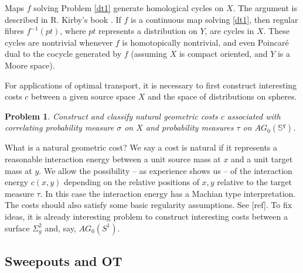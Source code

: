 \documentclass[12pt]{amsart}
\newtheorem{prob}{Problem}
\theoremstyle{remark}
\begin{document}
Maps $f$ solving Problem \ref{dt1} generate homological cycles on $X$. The argument is described in R. Kirby's book \cite{kirby}. If $f$ is a continuous map solving \ref{dt1}, then regular fibres $f^{-1}(pt)$, where $pt$ represents a distribution on $Y$, are cycles in $X$. These cycles are nontrivial whenever $f$ is homotopically nontrivial, and even Poincar\'e dual to the cocycle generated by $f$ (assuming $X$ is compact oriented, and $Y$ is a Moore space).



For applications of optimal transport, it is necessary to first construct interesting costs $c$ between a given source space $X$ and the space of distributions on spheres. 

\begin{prob} 
Construct and classify natural geometric costs $c$ associated with correlating probability measure $\sigma$ on $X$ and probability measures $\tau$ on $AG_0(\mathbb{S}^q)$.

\end{prob}

What is a natural geometric cost? We say a cost is natural if it represents a reasonable interaction energy between a unit source mass at $x$ and a unit target mass at $y$. We allow the possibility -- as experience shows us -- of the interaction energy $c(x,y)$ depending on the relative positions of $x,y$ relative to the target measure $\tau$. In this case the interaction energy has a Machian type interpretation. The costs should also satisfy some basic regularity assumptions. See [ref]. To fix ideas, it is already interesting problem to construct interesting costs between a surface $\Sigma_g^2$ and, say, $AG_0(S^1)$.



\subsection{Sweepouts and OT}
\end{document}
